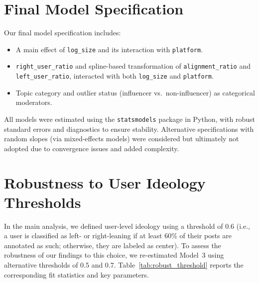 \documentclass[letterpaper]{article} %
\begin{document}
\section*{Final Model Specification}

Our final model specification includes:

\begin{itemize}
    \item A main effect of \texttt{log\_size} and its interaction with \texttt{platform}.
    \item \texttt{right\_user\_ratio} and spline-based transformation of \texttt{alignment\_ratio} and \texttt{left\_user\_ratio}, interacted with both \texttt{log\_size} and \texttt{platform}.
    \item Topic category and outlier status (influencer vs.\ non-influencer) as categorical moderators.
\end{itemize}

All models were estimated using the \texttt{statsmodels} package in Python, with robust standard errors and diagnostics to ensure stability. Alternative specifications with random slopes (via mixed-effects models) were considered but ultimately not adopted due to convergence issues and added complexity.

\section*{Robustness to User Ideology Thresholds}

In the main analysis, we defined user-level ideology using a threshold of 0.6 (i.e., a user is classified as left- or right-leaning if at least 60\% of their posts are annotated as such; otherwise, they are labeled as center). To assess the robustness of our findings to this choice, we re-estimated Model~3 using alternative thresholds of 0.5 and 0.7. Table~\ref{tab:robust_threshold} reports the corresponding fit statistics and key parameters.
\end{document}
